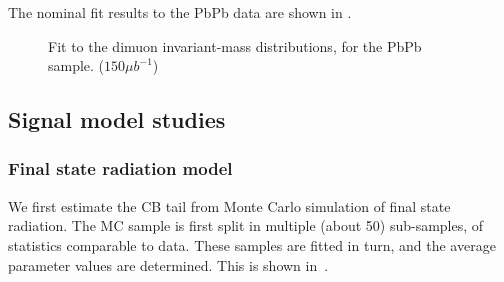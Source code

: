The nominal fit results to the PbPb data are shown in . 
%
%
\begin{figure}[hbtp]
  \begin{center}
    \label{fig:massfit_nominal}
  \caption{Fit to the dimuon invariant-mass distributions, for the PbPb sample. ($150 \mu b^{-1}$) }
  \label{fig:massfit_nominal_all}
  \end{center}
\end{figure}

\subsection{Signal model studies}


\subsubsection{Final state radiation model}


We first estimate the CB tail from Monte Carlo simulation of final state radiation. %
The MC sample is first split in multiple (about 50) sub-samples, of statistics comparable to data. These samples are fitted in turn, and the average parameter values are determined. This is shown in~. 
 
